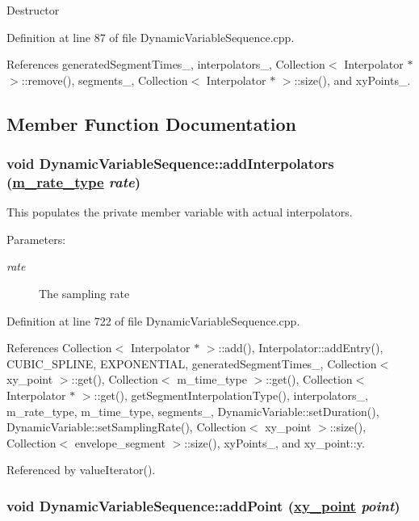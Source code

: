 Destructor 

Definition at line 87 of file Dynamic\-Variable\-Sequence.cpp.

References generated\-Segment\-Times\_\-, interpolators\_\-, Collection$<$ Interpolator $\ast$ $>$::remove(), segments\_\-, Collection$<$ Interpolator $\ast$ $>$::size(), and xy\-Points\_\-.

\subsection{Member Function Documentation}
\hypertarget{classDynamicVariableSequence_d0}{
\subsubsection[addInterpolators]{\setlength{\rightskip}{0pt plus 5cm}void Dynamic\-Variable\-Sequence::add\-Interpolators (\hyperlink{Types_8h_a4}{m\_\-rate\_\-type} {\em rate})}}
\label{classDynamicVariableSequence_d0}


This populates the private member variable with actual interpolators. \begin{Desc}
\item[Parameters:]
\begin{description}
\item[{\em rate}]The sampling rate \end{description}
\end{Desc}


Definition at line 722 of file Dynamic\-Variable\-Sequence.cpp.

References Collection$<$ Interpolator $\ast$ $>$::add(), Interpolator::add\-Entry(), CUBIC\_\-SPLINE, EXPONENTIAL, generated\-Segment\-Times\_\-, Collection$<$ xy\_\-point $>$::get(), Collection$<$ m\_\-time\_\-type $>$::get(), Collection$<$ Interpolator $\ast$ $>$::get(), get\-Segment\-Interpolation\-Type(), interpolators\_\-, m\_\-rate\_\-type, m\_\-time\_\-type, segments\_\-, Dynamic\-Variable::set\-Duration(), Dynamic\-Variable::set\-Sampling\-Rate(), Collection$<$ xy\_\-point $>$::size(), Collection$<$ envelope\_\-segment $>$::size(), xy\-Points\_\-, and xy\_\-point::y.

Referenced by value\-Iterator().\hypertarget{classDynamicVariableSequence_a16}{
\subsubsection[addPoint]{\setlength{\rightskip}{0pt plus 5cm}void Dynamic\-Variable\-Sequence::add\-Point (\hyperlink{structxy__point}{xy\_\-point} {\em point})}}
\label{classDynamicVariableSequence_a16}



